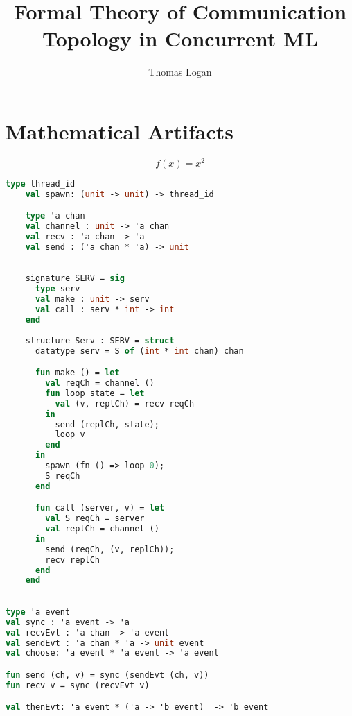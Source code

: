 \documentclass{article}
\title{Formal Theory of Communication Topology in Concurrent ML}
\author{Thomas Logan}
\begin{document}
  \maketitle
            
  \newpage
  
  \section{Mathematical Artifacts}

  \begin{equation*}
    f(x) = x^2
  \end{equation*}

  \begin{lstlisting}[language=ML, style=mystyle]
    type thread_id
    val spawn: (unit -> unit) -> thread_id

    type 'a chan
    val channel : unit -> 'a chan
    val recv : 'a chan -> 'a
    val send : ('a chan * 'a) -> unit
  \end{lstlisting}

  \begin{lstlisting}[language=ML, style=mystyle]

    signature SERV = sig 
      type serv
      val make : unit -> serv
      val call : serv * int -> int
    end
    
    structure Serv : SERV = struct 
      datatype serv = S of (int * int chan) chan 

      fun make () = let 
        val reqCh = channel ()
        fun loop state = let
          val (v, replCh) = recv reqCh
        in 
          send (replCh, state);
          loop v 
        end    
      in
        spawn (fn () => loop 0);
        S reqCh
      end 

      fun call (server, v) = let 
        val S reqCh = server
        val replCh = channel ()
      in 
        send (reqCh, (v, replCh));
        recv replCh 
      end
    end
  \end{lstlisting}

  \begin{lstlisting}[language=ML, style=mystyle]

type 'a event
val sync : 'a event -> 'a
val recvEvt : 'a chan -> 'a event
val sendEvt : 'a chan * 'a -> unit event
val choose: 'a event * 'a event -> 'a event

fun send (ch, v) = sync (sendEvt (ch, v))
fun recv v = sync (recvEvt v)

val thenEvt: 'a event * ('a -> 'b event)  -> 'b event
    
  \end{lstlisting}
\end{document}

